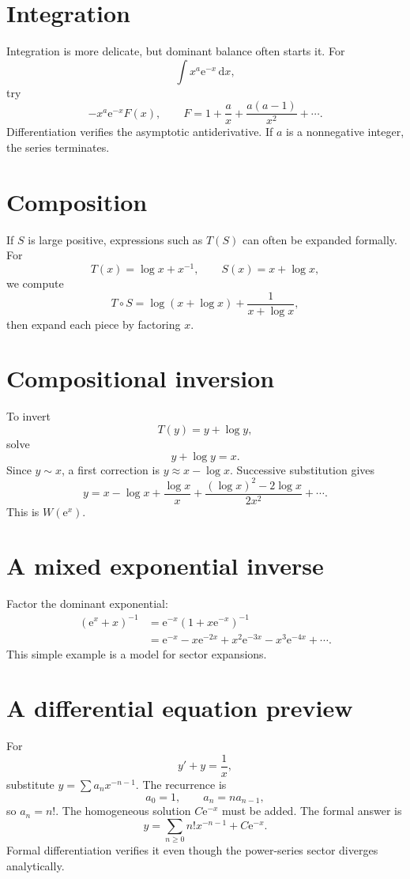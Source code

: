 \documentclass[11pt,oneside,openany]{book}
\newcommand{\e}{\mathrm{e}}
\newcommand{\dd}{\,\mathrm{d}}
\newcommand{\compose}{\mathbin{\circ}}
\theoremstyle{plain}
\theoremstyle{definition}
\theoremstyle{remark}
\begin{document}
\section{Integration}
Integration is more delicate, but dominant balance often starts it. For
\[
  \int x^a\e^{-x}\dd x,
\]
try
\[
  -x^a\e^{-x}F(x),
  \qquad F=1+\frac{a}{x}+\frac{a(a-1)}{x^2}+\cdots.
\]
Differentiation verifies the asymptotic antiderivative. If $a$ is a nonnegative integer, the series terminates.

\section{Composition}
If $S$ is large positive, expressions such as $T(S)$ can often be expanded formally. For
\[
  T(x)=\log x+x^{-1},
  \qquad S(x)=x+\log x,
\]
we compute
\[
  T\compose S=\log(x+\log x)+\frac1{x+\log x},
\]
then expand each piece by factoring $x$.

\section{Compositional inversion}
To invert
\[
  T(y)=y+\log y,
\]
solve
\[
  y+\log y=x.
\]
Since $y\sim x$, a first correction is $y\approx x-\log x$. Successive substitution gives
\[
  y=x-\log x+\frac{\log x}{x}
  +\frac{(\log x)^2-2\log x}{2x^2}+\cdots.
\]
This is $W(\e^x)$.

\section{A mixed exponential inverse}
Factor the dominant exponential:
\[
\begin{aligned}
  (\e^x+x)^{-1}
  &=\e^{-x}(1+x\e^{-x})^{-1}\\
  &=\e^{-x}-x\e^{-2x}+x^2\e^{-3x}
    -x^3\e^{-4x}+\cdots.
\end{aligned}
\]
This simple example is a model for sector expansions.

\section{A differential equation preview}
For
\[
  y'+y=\frac1x,
\]
substitute $y=\sum a_nx^{-n-1}$. The recurrence is
\[
  a_0=1,
  \qquad a_n=na_{n-1},
\]
so $a_n=n!$. The homogeneous solution $C\e^{-x}$ must be added. The formal answer is
\[
  y=\sum_{n\ge0}n!x^{-n-1}+C\e^{-x}.
\]
Formal differentiation verifies it even though the power-series sector diverges analytically.
\end{document}
